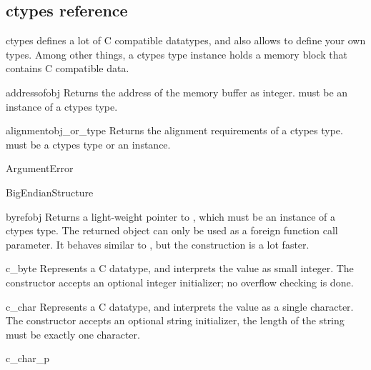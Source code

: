 \subsection{ctypes reference\label{ctypes-reference}}

ctypes defines a lot of C compatible datatypes, and also allows to
define your own types.  Among other things, a ctypes type instance
holds a memory block that contains C compatible data.

\begin{funcdesc}{addressof}{obj}
Returns the address of the memory buffer as integer.   must
be an instance of a ctypes type.
\end{funcdesc}

\begin{funcdesc}{alignment}{obj_or_type}
Returns the alignment requirements of a ctypes type.
 must be a ctypes type or an instance.
\end{funcdesc}

\begin{excclassdesc}{ArgumentError}{}
\end{excclassdesc}

\begin{classdesc}{BigEndianStructure}{}
\end{classdesc}

\begin{funcdesc}{byref}{obj}
Returns a light-weight pointer to , which must be an instance
of a ctypes type.  The returned object can only be used as a foreign
function call parameter.  It behaves similar to ,
but the construction is a lot faster.
\end{funcdesc}

\begin{classdesc}{c_byte}{}
Represents a C  datatype, and interprets the value
as small integer.  The constructor accepts an optional integer
initializer; no overflow checking is done.
\end{classdesc}

\begin{classdesc}{c_char}{}
Represents a C  datatype, and interprets the value as a
single character.  The constructor accepts an optional string
initializer, the length of the string must be exactly one character.
\end{classdesc}

\begin{classdesc}{c_char_p}{}
\end{classdesc}

